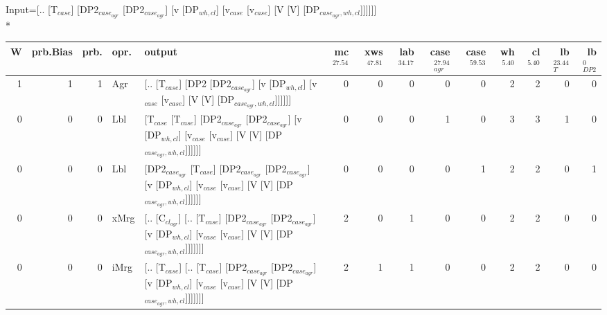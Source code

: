 \begingroup\scriptsize Input=[.. [T$_{case}$] [DP2$_{case_{agr}}$ [DP2$_{case_{agr}}$] [v [DP$_{wh,cl}$] [v$_{case}$ [v$_{case}$] [V [V] [DP$_{case_{agr},wh,cl}$]]]]]]\\*
\begin{tabularx}{\linewidth}{rrrlXrrrrrrrrr}
\hline
   W &   prb.Bias &   prb. & opr.   & output                                                                                                                                                                                                   &   mc$^{27.54}$ &   xws$^{47.81}$ &   lab$^{34.17}$ &   case$_{agr}^{27.94}$ &   case$^{59.53}$ &   wh$^{5.40}$ &   cl$^{5.40}$ &   lb$_{T}^{23.44}$ &   lb$_{DP2}^{0}$ \\
\hline
   1 &       1 &   1 & Agr  & [.. [T$_{case}$] [DP2 [DP2$_{case_{agr}}$] [v [DP$_{wh,cl}$] [v$_{case}$ [v$_{case}$] [V [V] [DP$_{case_{agr},wh,cl}$]]]]]]                                                                                                          &            0 &             0 &             0 &                  0 &              0 &           2 &           2 &              0 &            0 \\
   0 &       0 &   0 & Lbl  & [T$_{case}$ [T$_{case}$] [DP2$_{case_{agr}}$ [DP2$_{case_{agr}}$] [v [DP$_{wh,cl}$] [v$_{case}$ [v$_{case}$] [V [V] [DP$_{case_{agr},wh,cl}$]]]]]]                                                                                             &            0 &             0 &             0 &                  1 &              0 &           3 &           3 &              1 &            0 \\
   0 &       0 &   0 & Lbl  & [DP2$_{case_{agr}}$ [T$_{case}$] [DP2$_{case_{agr}}$ [DP2$_{case_{agr}}$] [v [DP$_{wh,cl}$] [v$_{case}$ [v$_{case}$] [V [V] [DP$_{case_{agr},wh,cl}$]]]]]]                                                                                       &            0 &             0 &             0 &                  0 &              1 &           2 &           2 &              0 &            1 \\
   0 &       0 &   0 & xMrg & [.. [C$_{cl_{agr}}$] [.. [T$_{case}$] [DP2$_{case_{agr}}$ [DP2$_{case_{agr}}$] [v [DP$_{wh,cl}$] [v$_{case}$ [v$_{case}$] [V [V] [DP$_{case_{agr},wh,cl}$]]]]]]]                                                                                 &            2 &             0 &             1 &                  0 &              0 &           2 &           2 &              0 &            0 \\
   0 &       0 &   0 & iMrg & [.. [T$_{case}$] [.. [T$_{case}$] [DP2$_{case_{agr}}$ [DP2$_{case_{agr}}$] [v [DP$_{wh,cl}$] [v$_{case}$ [v$_{case}$] [V [V] [DP$_{case_{agr},wh,cl}$]]]]]]]                                                                                   &            2 &             1 &             1 &                  0 &              0 &           2 &           2 &              0 &            0 \\

\end{tabularx}
